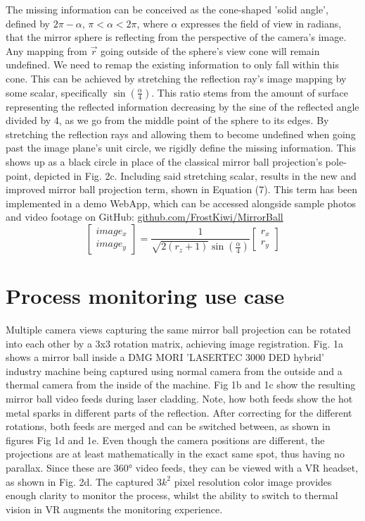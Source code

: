 \documentclass[10pt]{article}
\begin{document}
\begin{multicols}{2}
The missing information can be conceived as the cone-shaped 'solid angle', defined by $2\pi-\alpha$, $\pi<\alpha<2\pi$, where $\alpha$ expresses the field of view in radians, that the mirror sphere is reflecting from the perspective of the camera's image. Any mapping from $\vec{r}$ going outside of the sphere's view cone will remain undefined. We need to remap the existing information to only fall within this cone. This can be achieved by stretching the reflection ray's image mapping by some scalar, specifically $\sin{\left(\frac{\alpha}{4}\right)}$. This ratio stems from the amount of surface representing the reflected information decreasing by the sine of the reflected angle divided by 4, as we go from the middle point of the sphere to its edges. By stretching the reflection rays and allowing them to become undefined when going past the image plane's unit circle, we rigidly define the missing information. This shows up as a black circle in place of the classical mirror ball projection's pole-point, depicted in Fig. 2c. Including said stretching scalar, results in the new and improved mirror ball projection term, shown in Equation (7). This term has been implemented in a demo WebApp, which can be accessed alongside sample photos and video footage on GitHub: \href{https://github.com/FrostKiwi/MirrorBall}{github.com/FrostKiwi/MirrorBall}
$$\begin{bmatrix} image_x \\ image_y \end{bmatrix}=\frac{1}{\sqrt{2(r_z+1)}\sin{\left(\frac{\alpha}{4}\right)}}\begin{bmatrix} r_x \\ r_y \end{bmatrix}$$

 \section{Process monitoring use case}
 Multiple camera views capturing the same mirror ball projection can be rotated into each other by a 3x3 rotation matrix, achieving image registration. Fig. 1a shows a mirror ball inside a DMG MORI 'LASERTEC 3000 DED hybrid' industry machine being captured using normal camera from the outside and a thermal camera from the inside of the machine. Fig 1b and 1c show the resulting mirror ball video feeds during laser cladding. Note, how both feeds show the hot metal sparks in different parts of the reflection. After correcting for the different rotations, both feeds are merged and can be switched between, as shown in figures Fig 1d and 1e. Even though the camera positions are different, the projections are at least mathematically in the exact same spot, thus having no parallax. Since these are 360° video feeds, they can be viewed with a VR headset, as shown in Fig. 2d. The captured $3k^2$ pixel resolution color image provides enough clarity to monitor the process, whilst the ability to switch to thermal vision in VR augments the monitoring experience.


\end{multicols}
\end{document}

